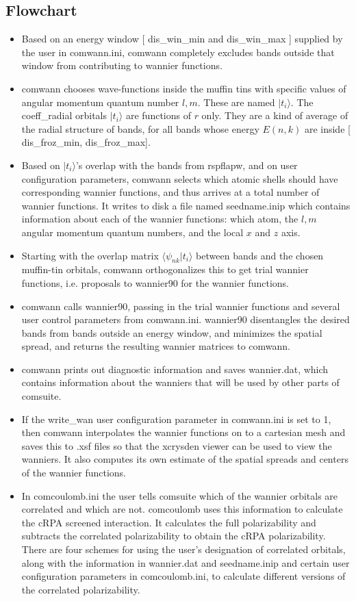 \documentclass[aps,prb,singlecolumn,preprintnumbers,amsmath,amssymb]{revtex4}
\begin{document}
\subsection{Flowchart}
\begin{itemize}
\item Based on an energy window  [ dis\_win\_min and dis\_win\_max ]  supplied by the user in comwann.ini, comwann completely excludes bands outside that window from contributing to wannier functions.
\item comwann chooses wave-functions inside the muffin tins with specific values of angular momentum quantum number $l,m$.  These are named $|t_i \rangle$.  The coeff\_radial  orbitals $|t_i \rangle$ are functions of $r$ only.  They are a kind of average of the radial structure of bands, for all bands whose energy $E(n,k)$ are inside [ dis\_froz\_min,  dis\_froz\_max].  
\item Based on $|t_i \rangle$'s overlap with the bands from rspflapw, and on user configuration parameters, comwann selects which atomic shells should have corresponding wannier functions, and thus arrives at a total number of wannier functions.  It writes to disk a file named seedname.inip which contains information about each of the wannier functions: which atom, the $l,m$ angular momentum quantum numbers, and the local $x$ and $z$ axis.
\item Starting with the overlap matrix $\langle \psi_{nk} | t_i \rangle$  between bands and the chosen muffin-tin orbitals, comwann orthogonalizes this to get trial wannier functions, i.e. proposals to wannier90 for the wannier functions.  
\item comwann calls wannier90, passing in the trial wannier functions and several user control parameters from comwann.ini.  wannier90 disentangles the desired bands from bands outside an energy window, and minimizes the spatial spread, and returns the resulting wannier matrices to comwann.
\item comwann prints out diagnostic information and saves wannier.dat, which contains information about the wanniers that will be used by other parts of comsuite.
\item If the write\_wan user configuration parameter in comwann.ini is set to 1, then comwann interpolates the wannier functions on to a cartesian mesh and saves this to .xsf files so that the xcrysden viewer can be used to view the wanniers.  It also computes its own estimate of the spatial spreads and centers of the wannier functions.
\item In comcoulomb.ini the user tells comsuite which of the wannier orbitals are correlated and which are not.  comcoulomb uses this information to calculate the cRPA screened interaction.  It calculates the full polarizability and subtracts the correlated polarizability to obtain the cRPA polarizability.  There are four schemes for using the user's designation of correlated orbitals, along with the information in wannier.dat and seedname.inip and certain user configuration parameters in comcoulomb.ini, to calculate  different versions of the correlated polarizability.

\end{itemize}
\end{document}
